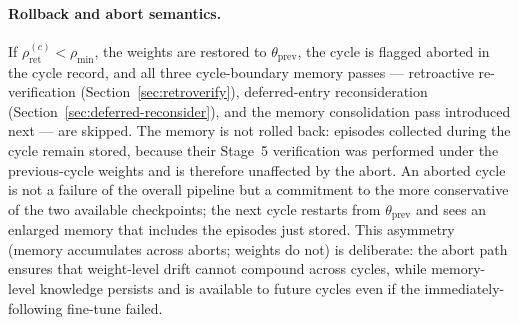 \paragraph{Rollback and abort semantics.}
If $\rho_{\text{ret}}^{(c)} < \rho_{\min}$, the weights are restored to $\theta_{\text{prev}}$, the cycle is flagged aborted in the cycle record, and all three cycle-boundary memory passes --- retroactive re-verification (Section~\ref{sec:retroverify}), deferred-entry reconsideration (Section~\ref{sec:deferred-reconsider}), and the memory consolidation pass introduced next --- are skipped. The memory is not rolled back: episodes collected during the cycle remain stored, because their Stage~5 verification was performed under the previous-cycle weights and is therefore unaffected by the abort. An aborted cycle is not a failure of the overall pipeline but a commitment to the more conservative of the two available checkpoints; the next cycle restarts from $\theta_{\text{prev}}$ and sees an enlarged memory that includes the episodes just stored. This asymmetry (memory accumulates across aborts; weights do not) is deliberate: the abort path ensures that weight-level drift cannot compound across cycles, while memory-level knowledge persists and is available to future cycles even if the immediately-following fine-tune failed.

